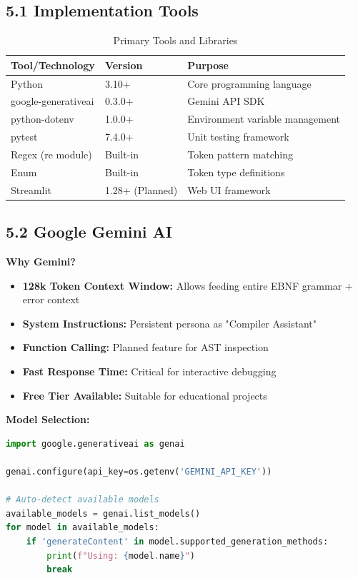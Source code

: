 \documentclass[a4paper,11pt]{article}
\begin{document}
\subsection{5.1 Implementation Tools}

\begin{table}[H]
\centering
\begin{tabularx}{\textwidth}{|l|l|X|}
\hline
\rowcolor{blue!10}
\textbf{Tool/Technology} & \textbf{Version} & \textbf{Purpose} \\
\hline
Python & 3.10+ & Core programming language \\
\hline
google-generativeai & 0.3.0+ & Gemini API SDK \\
\hline
python-dotenv & 1.0.0+ & Environment variable management \\
\hline
pytest & 7.4.0+ & Unit testing framework \\
\hline
Regex (re module) & Built-in & Token pattern matching \\
\hline
Enum & Built-in & Token type definitions \\
\hline
Streamlit & 1.28+ (Planned) & Web UI framework \\
\hline
\end{tabularx}
\caption{Primary Tools and Libraries}
\end{table}

\subsection{5.2 Google Gemini AI}

\textbf{Why Gemini?}
\begin{itemize}[leftmargin=*]
    \item \textbf{128k Token Context Window:} Allows feeding entire EBNF grammar + error context
    \item \textbf{System Instructions:} Persistent persona as "Compiler Assistant"
    \item \textbf{Function Calling:} Planned feature for AST inspection
    \item \textbf{Fast Response Time:} Critical for interactive debugging
    \item \textbf{Free Tier Available:} Suitable for educational projects
\end{itemize}

\textbf{Model Selection:}
\begin{lstlisting}[language=Python, caption=Dynamic Model Discovery]
import google.generativeai as genai

genai.configure(api_key=os.getenv('GEMINI_API_KEY'))

# Auto-detect available models
available_models = genai.list_models()
for model in available_models:
    if 'generateContent' in model.supported_generation_methods:
        print(f"Using: {model.name}")
        break
\end{lstlisting}
\end{document}

